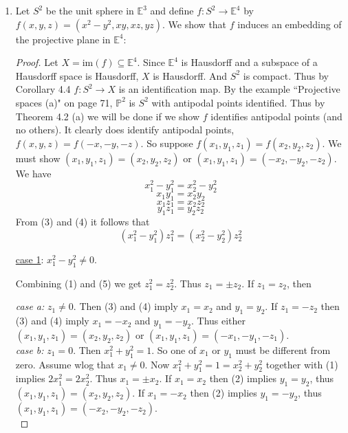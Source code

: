 \documentclass{book}
\begin{document}
\begin{enumerate}[(1)]
    \item Let $S^2$ be the unit sphere in $\mathbb E^3$ and define $f:S^2\rightarrow \mathbb E^4$ by $f(x,y,z)=(x^2-y^2,xy,xz,yz)$. We show that $f$ induces an embedding of the projective plane in $\mathbb E^4$: 
        \begin{proof}  Let $X=\text{im}(f)\subseteq\mathbb E^4$.  Since $\mathbb E^4$ is Hausdorff and a subspace of a Hausdorff space is Hausdorff, $X$ is Hausdorff.  And $S^2$ is compact.  Thus by Corollary 4.4 $f:S^2\rightarrow X$ is an identification map.  By the example ``Projective spaces (a)" on page 71, $\mathbb P^2$ is $S^2$ with antipodal points identified.  Thus by Theorem 4.2 (a) we will be done if we show $f$ identifies antipodal points (and no others).  It clearly does identify antipodal points, $f(x,y,z)=f(-x,-y,-z)$.  So suppose $f(x_1,y_1,z_1)=f(x_2,y_2,z_2)$.  We must show $(x_1,y_1,z_1)=(x_2,y_2,z_2)$ or $(x_1,y_1,z_1)=(-x_2,-y_2,-z_2)$.  We have
            \begin{equation}
                x_1^2-y_1^2=x_2^2-y_2^2
            \end{equation}
            \begin{equation}
                x_1y_1=x_2y_2
            \end{equation}
            \begin{equation}
                x_1z_1=x_2z_2
            \end{equation}
            \begin{equation}
                y_1z_1=y_2z_2
            \end{equation}
            From (3) and (4) it follows that
            \begin{equation}
                (x_1^2-y_1^2)z_1^2=(x_2^2-y_2^2)z_2^2
            \end{equation}

            \par\underline{case 1}: $x_1^2-y_1^2 \neq 0$.

            \par Combining (1) and (5) we get $z_1^2=z_2^2$.  Thus $z_1=\pm z_2$.  If $z_1=z_2$, then

            {\it case a:} $z_1\not=0$.  Then (3) and (4) imply $x_1=x_2$ and $y_1=y_2$.  If $z_1=-z_2$ then (3) and (4) imply $x_1=-x_2$ and $y_1=-y_2$.  Thus either $(x_1,y_1,z_1)=(x_2,y_2,z_2)$ or $(x_1,y_1,z_1)=(-x_1,-y_1,-z_1)$.\\

            {\it case b:} $z_1=0$.  Then $x_1^2+y_1^2=1$.  So one of $x_1$ or $y_1$ must be different from zero.  Assume wlog that $x_1\not=0$.   
            Now $x_1^2+y_1^2=1=x_2^2+y_2^2$ together with (1) implies $2x_1^2=2x_2^2$.  Thus $x_1=\pm x_2$.  If $x_1=x_2$ then (2) implies $y_1=y_2$, thus $(x_1,y_1,z_1)=(x_2,y_2,z_2)$.  If $x_1=-x_2$ then (2) implies $y_1=-y_2$, thus $(x_1,y_1,z_1)=(-x_2,-y_2,-z_2)$.  
            \\


\end{proof}
\end{enumerate}
\end{document}
